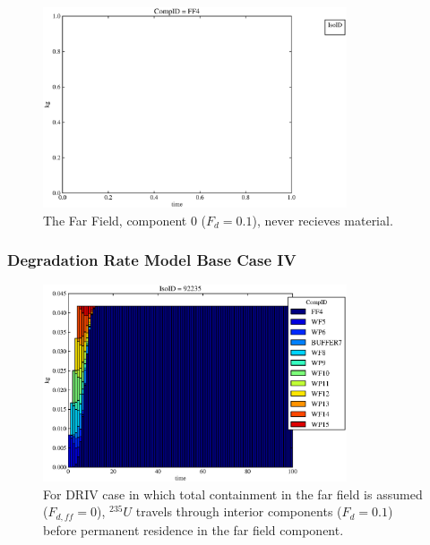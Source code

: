 \begin{frame}
\begin{figure}
\begin{minipage}[b]{0.45\linewidth}
  \includegraphics[width=0.8\textwidth]{./images/drIII0.eps}
  \caption[Case DRIII Waste Package Contaminants.]{ 
    The Far Field, component 0 ($F_d = 0.1$), never recieves material.
    }
  \label{fig:drIIIff0}


  \end{minipage}
\end{figure}
\end{frame}


\begin{frame}[ctb!]
  \frametitle{Degradation Rate Model Base Case IV}

\begin{figure}[ht]
\centering
\includegraphics[width=0.8\textwidth]{./images/drIV.eps}
\caption[$^{235}U$ residence. Degradation Rate Buffer No Release.]{
For DRIV case in which total containment in the far field is assumed ($F_{d,ff}=0$), 
$^{235}U$ travels through interior components ($F_d = 0.1$) before 
permanent residence in the far field component.
}
\label{fig:drIVall}
\end{figure}
\end{frame}

